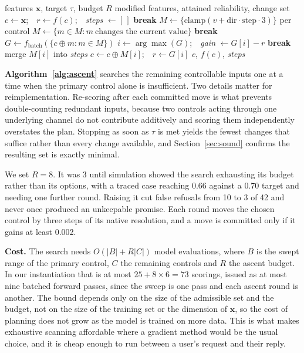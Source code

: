 \documentclass[conference,letterpaper]{IEEEtran}
\begin{document}
\begin{algorithm}[t]
\caption{Greedy coordinate ascent over remaining controls}
\label{alg:ascent}
\begin{algorithmic}[1]
\Require features $\mathbf{x}$, target $\tau$, budget $R$
\Ensure modified features, attained reliability, change set
\State $c \gets \mathbf{x}$;\ \ $r \gets f(c)$;\ \ \textit{steps} $\gets [\,]$
   \textbf{break} \EndIf
  \State $M \gets \{\text{clamp}(v + \text{dir}\cdot\text{step}\cdot 3)\}$ per control
  \State $M \gets \{m \in M : m\ \text{changes the current value}\}$
   \textbf{break} \EndIf
  \State $G \gets f_{\text{batch}}(\{c \oplus m : m \in M\})$
  \State $i \gets \arg\max(G)$;\ \ \textit{gain} $\gets G[i] - r$
   \textbf{break} \EndIf
  \State merge $M[i]$ into \textit{steps} 
  \State $c \gets c \oplus M[i]$;\ \ $r \gets G[i]$
\EndFor
\State \Return $c$, $f(c)$, \textit{steps}
\end{algorithmic}
\end{algorithm}

\textbf{Algorithm~\ref{alg:ascent}} searches the remaining controllable inputs
one at a time when the primary control alone is insufficient. Two details matter
for reimplementation. Re-scoring after each committed move is what prevents
double-counting redundant inputs, because two controls acting through one
underlying channel do not contribute additively and scoring them independently
overstates the plan. Stopping as soon as $\tau$ is met yields the fewest changes
that suffice rather than every change available, and
Section~\ref{sec:sound} confirms the resulting set is exactly minimal.

We set $R = 8$. It was 3 until simulation showed the search exhausting its
budget rather than its options, with a traced case reaching 0.66 against a 0.70
target and needing one further round. Raising it cut false refusals from 10 to 3
of 42 and never once produced an unkeepable promise. Each round moves the chosen
control by three steps of its native resolution, and a move is committed only if
it gains at least 0.002.

\textbf{Cost.} The search needs $O(|B| + R|C|)$ model evaluations, where $B$ is
the swept range of the primary control, $C$ the remaining controls and $R$ the
ascent budget. In our instantiation that is at most $25 + 8 \times 6 = 73$
scorings, issued as at most nine batched forward passes, since the sweep is one
pass and each ascent round is another. The bound depends only on the size of the
admissible set and the budget, not on the size of the training set or the
dimension of $\mathbf{x}$, so the cost of planning does not grow as the model is
trained on more data. This is what makes exhaustive scanning affordable where a
gradient method would be the usual choice, and it is cheap enough to run between
a user's request and their reply.
\end{document}
